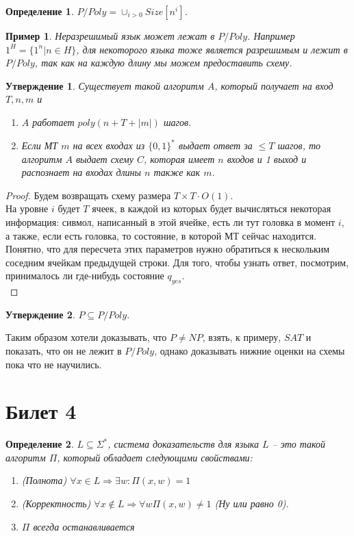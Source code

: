 \documentclass[12pt, letterpaper]{article}
\newtheorem{prop}{Утверждение}[section]
\newtheorem{defi}{Определение}[section]
\newtheorem{sample}{Пример}[section]
\begin{document}
\begin{defi}
$P/Poly = \cup_{i>0} Size[n^i]$.
\end{defi}

\begin{sample}
Неразрешимый язык может лежат в $P/Poly$. Например $1^{H}=\{1^{n} | n \in H \}$, для некоторого языка тоже является разрешимым и лежит в $P/Poly$, так как на каждую длину мы можем предоставить схему.  
\end{sample}

\begin{prop}
Существует такой алгоритм $A$, который получает на вход $T,n,m$ и 
\begin{enumerate}
\item $A$ работает $poly(n + T + |m|)$ шагов.
\item Если МТ $m$ на всех входах из $\{0,1\}^{*}$ выдает ответ за $\leq T$ шагов, то алгоритм $A$ выдает схему $C$, которая имеет $n$ входов и 1 выход и распознает на входах длины $n$ также как $m$.
\end{enumerate}
\end{prop}
\begin{proof}
Будем возвращать схему размера $T \times T \cdot O(1)$.\\
На уровне $i$ будет $T$ ячеек, в каждой из которых будет вычисляться некоторая информация: сивмол, написанный в этой ячейке, есть ли тут головка в момент $i$, а также, если есть головка, то состояние, в которой МТ сейчас находится. Понятно, что для пересчета этих параметров нужно обратиться к нескольким соседним ячейкам предыдущей строки. Для того, чтобы узнать ответ, посмотрим, принималось ли где-нибудь состояние $q_{yes}$.\\
\end{proof}

\begin{prop}
$P \subseteq P/Poly$.
\end{prop}

Таким образом хотели доказывать, что $P \neq NP$, взять, к примеру, $SAT$ и показать, что он не лежит в $P / Poly$, однако доказывать нижние оценки на схемы пока что не научились.

\section{Билет 4}
\begin{defi}
$L \subseteq \Sigma^{*}$, система доказательств для языка $L$ -- это такой алгоритм $\Pi$, который обладает следующими свойствами:
\begin{enumerate}
\item (Полнота) $\forall x \in L \Rightarrow \exists w : \Pi(x,w)=1$
\item (Корректность) $\forall x \notin L \Rightarrow \forall w \Pi(x,w) \neq 1$ 
(Ну или равно 0).
\item $\Pi$ всегда останавливается  
\end{enumerate}
\end{defi}
\end{document}
